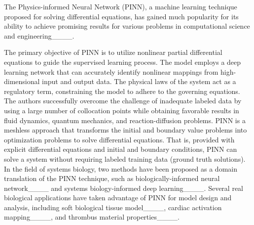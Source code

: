 The Physics-informed Neural Network (PINN), a machine learning technique proposed for solving differential equations, has gained much popularity for its ability to achieve promising results for various problems in computational science and engineering____.

The primary objective of PINN is to utilize nonlinear partial differential equations to guide the supervised learning process. The model employs a deep learning network that can accurately identify nonlinear mappings from high-dimensional input and output data. The physical laws of the system act as a regulatory term, constraining the model to adhere to the governing equations. The authors successfully overcome the challenge of inadequate labeled data by using a large number of collocation points while obtaining favorable results in fluid dynamics, quantum mechanics, and reaction-diffusion problems. PINN is a meshless approach that transforms the initial and boundary value problems into optimization problems to solve differential equations.
That is, provided with explicit differential equations and initial and boundary conditions, PINN can solve a system without requiring labeled training data (ground truth solutions).
In the field of systems biology, two methods have been proposed as a domain translation of the PINN technique, such as 
biologically-informed neural network____ and systems biology-informed deep learning____.
Several real biological applications have taken advantage of PINN for model design and analysis, including soft biological tissue model____, cardiac activation mapping____, and thrombus material properties____.


